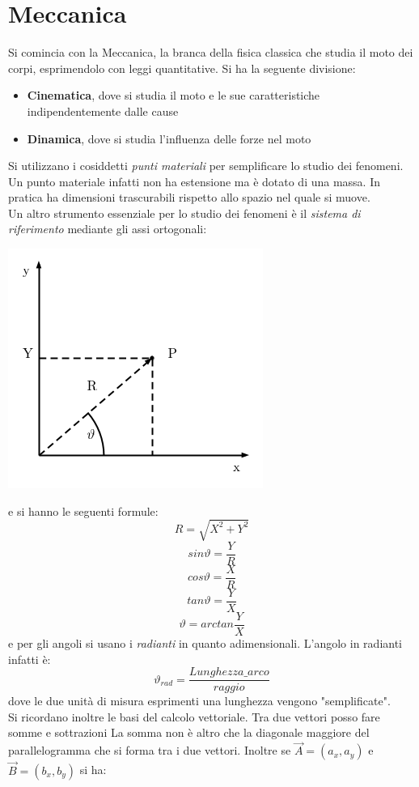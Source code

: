 \documentclass[a4paper,12pt, oneside]{book}
\begin{document}
\chapter{Meccanica}
Si comincia con la Meccanica, la branca della fisica classica che studia il moto dei corpi, esprimendolo con leggi quantitative. Si ha la seguente divisione:
\begin{itemize}
\item \textbf{Cinematica}, dove si studia il moto e le sue caratteristiche indipendentemente dalle cause
\item \textbf{Dinamica}, dove si studia l'influenza delle forze nel moto 
\end{itemize}
Si utilizzano i cosiddetti \textit{punti materiali} per semplificare lo studio dei fenomeni. Un punto materiale infatti non ha estensione ma è dotato di una massa. In pratica ha dimensioni trascurabili rispetto allo spazio nel quale si muove.\\
Un altro strumento essenziale per lo studio dei fenomeni è il \textit{sistema di riferimento} mediante gli assi ortogonali:
\begin{center}
\includegraphics[scale=0.7]{img/ref.png}
\end{center}
\newpage
e si hanno le seguenti formule:
$$R=\sqrt{X^2+Y^2}$$
$$sin \vartheta=\frac{Y}{R}$$
$$cos \vartheta=\frac{X}{R}$$
$$tan \vartheta = \frac{Y}{X}$$
$$\vartheta= arctan \frac{Y}{X}$$
e per gli angoli si usano i \textit{radianti} in quanto adimensionali. L'angolo in radianti infatti è:
$$\vartheta_{rad}=\frac{Lunghezza\_arco}{raggio}$$
dove le due unità di misura esprimenti una lunghezza vengono "semplificate".\\
Si ricordano inoltre le basi del calcolo vettoriale. Tra due vettori posso fare somme e sottrazioni 
La somma non è altro che la diagonale maggiore del parallelogramma che si forma tra i due vettori. Inoltre se $\vec{A}=(a_x,a_y)$ e $\vec{B}=(b_x,b_y)$ si ha:
\end{document}
